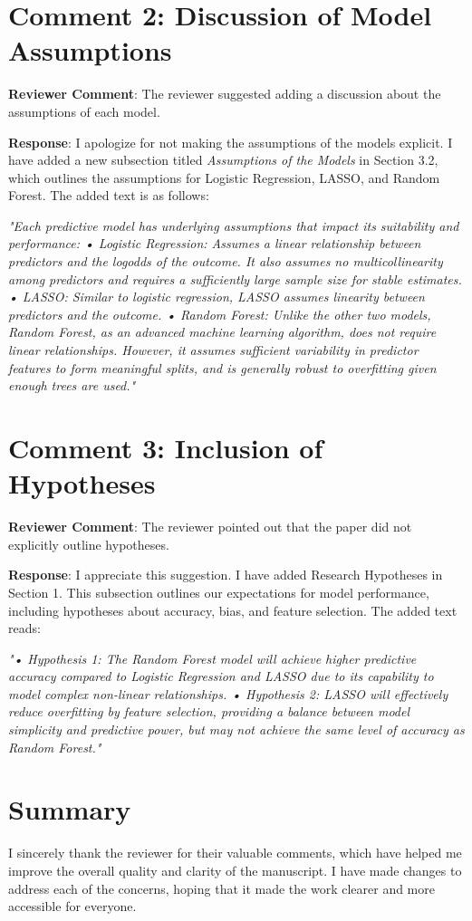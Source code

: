 \documentclass[12pt]{article}
\begin{document}
\section*{Comment 2: Discussion of Model Assumptions}
\textbf{Reviewer Comment}: The reviewer suggested adding a discussion about the assumptions of each model.

\textbf{Response}: I apologize for not making the assumptions of the models explicit. I have added a new subsection titled \textit{Assumptions of the Models} in Section 3.2, which outlines the assumptions for Logistic Regression, LASSO, and Random Forest. The added text is as follows:

\textit{"Each predictive model has underlying assumptions that impact its suitability and performance:
• Logistic Regression: Assumes a linear relationship between predictors and the logodds of the outcome. It also assumes no multicollinearity among predictors and requires a sufficiently large sample size for stable estimates.
• LASSO: Similar to logistic regression, LASSO assumes linearity between predictors and the outcome.
• Random Forest: Unlike the other two models, Random Forest, as an advanced machine learning algorithm, does not require linear relationships. However, it assumes
sufficient variability in predictor features to form meaningful splits, and is generally robust to overfitting given enough trees are used."}

\section*{Comment 3: Inclusion of Hypotheses}
\textbf{Reviewer Comment}: The reviewer pointed out that the paper did not explicitly outline hypotheses.

\textbf{Response}: I appreciate this suggestion. I have added Research Hypotheses in Section 1. This subsection outlines our expectations for model performance, including hypotheses about accuracy, bias, and feature selection. The added text reads:

\textit{"• Hypothesis 1: The Random Forest model will achieve higher predictive accuracy compared to Logistic Regression and LASSO due to its capability to model complex non-linear relationships.
• Hypothesis 2: LASSO will effectively reduce overfitting by feature selection, providing a balance between model simplicity and predictive power, but may not achieve the same level of accuracy as Random Forest."}


\section*{Summary}
I sincerely thank the reviewer for their valuable comments, which have helped me improve the overall quality and clarity of the manuscript. I have made changes to address each of the concerns, hoping that it made the work clearer and more accessible for everyone.
\end{document}
